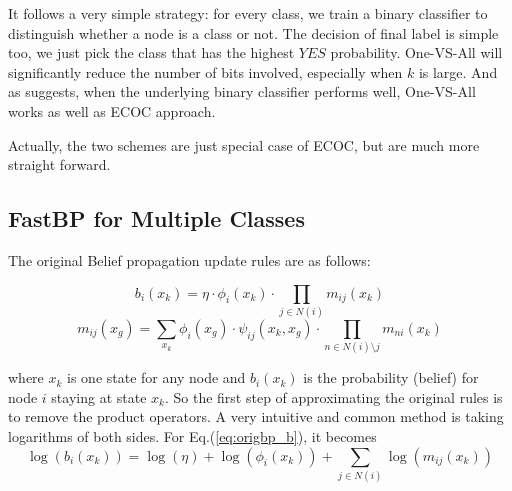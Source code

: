 It follows a very simple strategy: for every class, we train a binary classifier to distinguish whether a node is a class or not. The decision of final label is simple too, we just pick the class that has the highest $YES$ probability. One-VS-All will significantly reduce the number of bits involved, especially when $k$ is large. And as \cite{Ryan2000} suggests, when the underlying binary classifier performs well, One-VS-All works as well as ECOC approach.


Actually, the two schemes are just special case of ECOC, but are much more straight forward.


\subsection{FastBP for Multiple Classes}
The original Belief propagation update rules are as follows:

\begin{equation}
\label{eq:origbp_b}
b_i(x_k) = \eta\cdot \phi_i(x_k)\cdot\mathop{\prod}_{j\in N(i)}m_{ij}(x_k)
\end{equation}
\begin{equation}
\label{eq:origbp_m}
m_{ij}(x_g)=\mathop{\sum}_{x_k}\phi_{i}(x_g)\cdot \psi_{ij}(x_k,x_g)\cdot\mathop{\prod}_{n\in N(i)\setminus j} m_{ni}(x_k)
\end{equation}

where $x_k$ is one state for any node and $b_i(x_k)$ is the probability (belief) for node $i$ staying at state $x_k$. So the first step of approximating the original rules is to remove the product operators. A very intuitive and common method is taking logarithms of both sides. For Eq.(\ref{eq:origbp_b}), it becomes
\begin{equation}
\log(b_i(x_k)) = \log(\eta) + \log(\phi_i(x_k)) + \mathop{\sum}_{j\in N(i)}\log(m_{ij}(x_k))
\end{equation}

